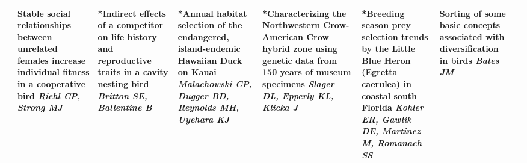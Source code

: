 \begin{tabular}{|x{0.85cm}|x{2.85cm}|x{2.85cm}|x{2.85cm}|x{2.85cm}|x{2.85cm}|x{2.85cm}|a{2.85cm}|}
&Stable social relationships between unrelated females increase individual fitness in a cooperative bird \newline \newline \textit{Riehl CP, Strong MJ} & *Indirect effects of a competitor on life history and reproductive traits in a cavity nesting bird \newline \newline \textit{Britton SE, Ballentine B} & *Annual habitat selection of the endangered, island-endemic Hawaiian Duck on Kauai \newline \newline \textit{Malachowski CP, Dugger BD, Reynolds MH, Uyehara KJ} & *Characterizing the Northwestern Crow-American Crow hybrid zone using genetic data from 150 years of museum specimens \newline \newline \textit{Slager DL, Epperly KL, Klicka J} & *Breeding season prey selection trends by the Little Blue Heron (Egretta caerulea) in coastal south Florida \newline \newline \textit{Kohler ER, Gawlik DE, Martinez M, Romanach SS} & Sorting of some basic concepts associated with diversification in birds \newline \newline \textit{Bates JM} &  \newline \newline \textit{}\\
\hline

\end{tabular}
